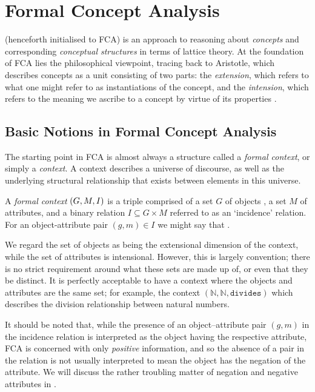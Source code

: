 \chapter{Formal Concept Analysis}
\label{chapter:formal-concept-analysis}

\FCA (henceforth initialised to FCA) is an approach to reasoning about \textit{concepts} and corresponding \textit{conceptual structures} in terms of lattice theory. At the foundation of FCA lies the philosophical
viewpoint, tracing back to Aristotle, which describes concepts as a unit consisting of two parts: the \textit{extension}, which refers to what one might refer to as instantiations of the concept, and the
\textit{intension}, which refers to the meaning we ascribe to a concept by virtue of its properties \cite{ganter1999formal, WILLE1992493, DUQUENNE1999407}.

\section{Basic Notions in Formal Concept Analysis}
\label{section:basic-notions}

The starting point in FCA is almost always a structure called a \textit{formal context}, or simply a \textit{context}. A context describes a universe of discourse, as well as the underlying structural
relationship that exists between elements in this universe.
%
\begin{definition}
  \label{definition:formal-context}  A \textit{formal context} $(G,M,\mathrel{I})$ is a triple comprised of a set $G$ of objects , a set $M$ of attributes, and a binary relation $I \subseteq G
  \times M$ referred to as an `incidence' relation. For an object-attribute pair $(g,m) \in I$ we might say that .
\end{definition}

We regard the set of objects as being the extensional dimension of the context, while the set of attributes is intensional. However, this is largely convention; there is no strict requirement around what
these sets are made up of, or even that they be distinct. It is perfectly acceptable to have a context where the objects and attributes are the same set; for example, the context $(\mathbb{N}, \mathbb{N}
, \texttt{divides})$ which describes the division relationship between natural numbers.

It should be noted that, while the presence of an object--attribute pair $(g,m)$ in the incidence relation is interpreted as the object having the respective attribute, FCA is concerned with only
\textit{positive} information, and so the absence of a pair in the relation is not usually interpreted to mean the object has the negation of the attribute. We will discuss the rather troubling matter
of negation and negative attributes in .

